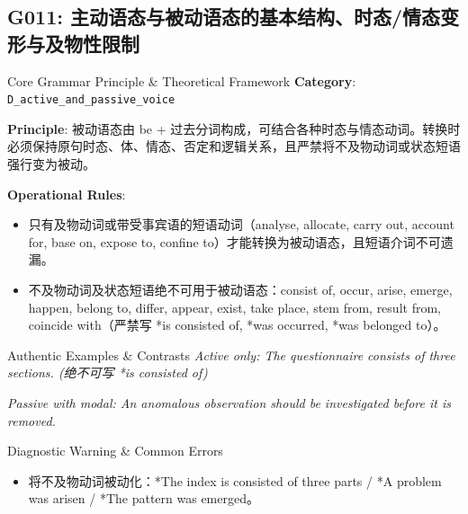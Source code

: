 \subsection{G011: 主动语态与被动语态的基本结构、时态/情态变形与及物性限制}\label{sec:rule:G011}
\begin{ConceptBox}{Core Grammar Principle \& Theoretical Framework}
\textbf{Category}: \texttt{D\_active\_and\_passive\_voice}\par\vspace{3pt}
\textbf{Principle}: 被动语态由 be + 过去分词构成，可结合各种时态与情态动词。转换时必须保持原句时态、体、情态、否定和逻辑关系，且严禁将不及物动词或状态短语强行变为被动。\par\vspace{4pt}
\textbf{Operational Rules}:
\begin{itemize}[leftmargin=1.5em, itemsep=1pt]
  \item 只有及物动词或带受事宾语的短语动词（analyse, allocate, carry out, account for, base on, expose to, confine to）才能转换为被动语态，且短语介词不可遗漏。
  \item 不及物动词及状态短语绝不可用于被动语态：consist of, occur, arise, emerge, happen, belong to, differ, appear, exist, take place, stem from, result from, coincide with（严禁写 *is consisted of, *was occurred, *was belonged to）。
\end{itemize}
\end{ConceptBox}
\begin{ExampleBox}{Authentic Examples \& Contrasts}
\textit{Active only: The questionnaire consists of three sections. (绝不可写 *is consisted of)}\par\vspace{2pt}
\textit{Passive with modal: An anomalous observation should be investigated before it is removed.}\par\vspace{2pt}
\end{ExampleBox}
\begin{TipBox}{Diagnostic Warning \& Common Errors}
\begin{itemize}[leftmargin=1.5em, itemsep=1pt]
  \item 将不及物动词被动化：*The index is consisted of three parts / *A problem was arisen / *The pattern was emerged。
\end{itemize}
\end{TipBox}
\vspace{6pt}
